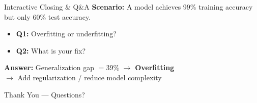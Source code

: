\documentclass[aspectratio=169, 10pt]{beamer}
\begin{document}
\begin{frame}{Interactive Closing \& Q\&A}
  \textbf{Scenario:} A model achieves 99\% training accuracy but only 60\% test accuracy.

  \vspace{1em}
  \begin{itemize}
    \item \textbf{Q1:} Overfitting or underfitting?
    \item \textbf{Q2:} What is your fix?
  \end{itemize}

  \vspace{1em}
  \pause
  \textbf{Answer:}
  Generalization gap $= 39\%$ $\rightarrow$ \textbf{Overfitting}\\
  $\rightarrow$ Add regularization / reduce model complexity

  \vfill
  \begin{center}
    {\Large Thank You --- Questions?}
  \end{center}
\end{frame}
\end{document}
